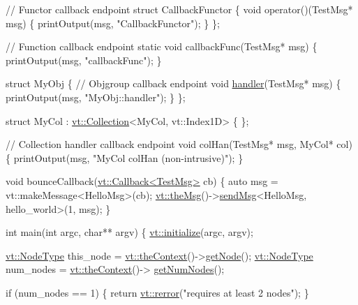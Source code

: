 \begin{DoxyCodeInclude}
\textcolor{comment}{// Functor callback endpoint}
\textcolor{keyword}{struct }CallbackFunctor \{
  \textcolor{keywordtype}{void} operator()(TestMsg* msg) \{
    printOutput(msg, \textcolor{stringliteral}{"CallbackFunctor"});
  \}
\};

\textcolor{comment}{// Function callback endpoint}
\textcolor{keyword}{static} \textcolor{keywordtype}{void} callbackFunc(TestMsg* msg) \{
  printOutput(msg, \textcolor{stringliteral}{"callbackFunc"});
\}

\textcolor{keyword}{struct }MyObj \{
  \textcolor{comment}{// Objgroup callback endpoint}
  \textcolor{keywordtype}{void} \hyperlink{namespacevt_1_1config_a6bd1d6215bda0d8ca02811798399f689a82a0081a94d5c5dfd18b0b3f7eca64b7}{handler}(TestMsg* msg) \{
    printOutput(msg, \textcolor{stringliteral}{"MyObj::handler"});
  \}
\};

\textcolor{keyword}{struct }MyCol : \hyperlink{structvt_1_1vrt_1_1collection_1_1_collection}{vt::Collection}<MyCol, vt::Index1D> \{ \};

\textcolor{comment}{// Collection handler callback endpoint}
\textcolor{keywordtype}{void} colHan(TestMsg* msg, MyCol* col) \{
  printOutput(msg, \textcolor{stringliteral}{"MyCol colHan (non-intrusive)"});
\}

\textcolor{keywordtype}{void} bounceCallback(\hyperlink{structvt_1_1pipe_1_1callback_1_1cbunion_1_1_callback_typed}{vt::Callback<TestMsg>} cb) \{
  \textcolor{keyword}{auto} msg = vt::makeMessage<HelloMsg>(cb);
  \hyperlink{namespacevt_aeafd31f866aeb4dc6fc2f6ee97136350}{vt::theMsg}()->\hyperlink{group__preregister_ga0162a39473e7f9b490a79a7983d949ac}{sendMsg}<HelloMsg, hello\_world>(1, msg);
\}

\textcolor{keywordtype}{int} main(\textcolor{keywordtype}{int} argc, \textcolor{keywordtype}{char}** argv) \{
  \hyperlink{namespacevt_aaa266774ea8339c58be0202b00fafa62}{vt::initialize}(argc, argv);

  \hyperlink{namespacevt_a866da9d0efc19c0a1ce79e9e492f47e2}{vt::NodeType} this\_node = \hyperlink{namespacevt_a26551fe0e6e6a1371111df5b12c7e92c}{vt::theContext}()->\hyperlink{structvt_1_1ctx_1_1_context_a0d52c263ce8516546a67443d9a86fa5f}{getNode}();
  \hyperlink{namespacevt_a866da9d0efc19c0a1ce79e9e492f47e2}{vt::NodeType} num\_nodes = \hyperlink{namespacevt_a26551fe0e6e6a1371111df5b12c7e92c}{vt::theContext}()->
      \hyperlink{structvt_1_1ctx_1_1_context_a7f41071aadf6d5fa9e1b6c703c5ff19d}{getNumNodes}();

  \textcolor{keywordflow}{if} (num\_nodes == 1) \{
    \textcolor{keywordflow}{return} \hyperlink{namespacevt_aff96ace008dc847d4c0f44cfa5dfb3a0}{vt::rerror}(\textcolor{stringliteral}{"requires at least 2 nodes"});
  \}


\end{DoxyCodeInclude}
